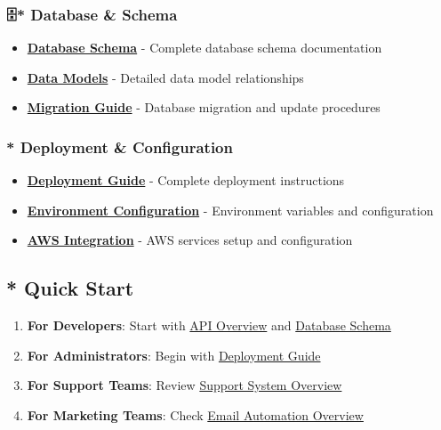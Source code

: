 \documentclass[11pt,a4paper]{article}
\begin{document}
\hypertarget{database-schema}{%
\subsubsection{🗄* Database \& Schema}\label{database-schema}}

\begin{itemize}
\tightlist
\item
  \textbf{\href{./database/schema.md}{Database Schema}} - Complete
  database schema documentation
\item
  \textbf{\href{./database/models.md}{Data Models}} - Detailed data
  model relationships
\item
  \textbf{\href{./database/migrations.md}{Migration Guide}} - Database
  migration and update procedures
\end{itemize}

\hypertarget{deployment-configuration}{%
\subsubsection{* Deployment \&
Configuration}\label{deployment-configuration}}

\begin{itemize}
\tightlist
\item
  \textbf{\href{./deployment/deployment-guide.md}{Deployment Guide}} -
  Complete deployment instructions
\item
  \textbf{\href{./deployment/environment-config.md}{Environment
  Configuration}} - Environment variables and configuration
\item
  \textbf{\href{./deployment/aws-integration.md}{AWS Integration}} - AWS
  services setup and configuration
\end{itemize}

\hypertarget{quick-start}{%
\subsection{* Quick Start}\label{quick-start}}

\begin{enumerate}
\def\labelenumi{\arabic{enumi}.}
\tightlist
\item
  \textbf{For Developers}: Start with \href{./api/overview.md}{API
  Overview} and \href{./database/schema.md}{Database Schema}
\item
  \textbf{For Administrators}: Begin with
  \href{./deployment/deployment-guide.md}{Deployment Guide}
\item
  \textbf{For Support Teams}: Review
  \href{./support/overview.md}{Support System Overview}
\item
  \textbf{For Marketing Teams}: Check
  \href{./email/automation-overview.md}{Email Automation Overview}
\end{enumerate}
\end{document}
